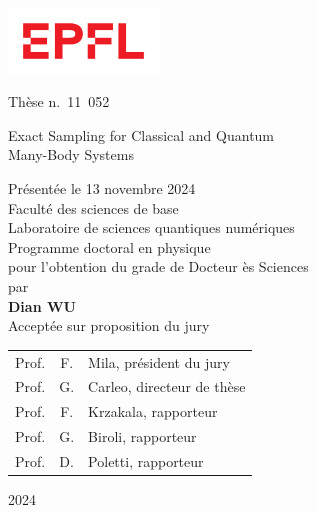 
\begin{titlepage}
\begin{otherlanguage}{french}

\sffamily

\begin{flushleft}
\parbox{0.3\textwidth}{\includegraphics[width=4cm]{images/epfl}}
\end{flushleft}

\begin{flushright}
Thèse n.~11~052
\end{flushright}

\null\vspace{2cm}

\begin{minipage}{4cm}
\end{minipage}
\hfill
\begin{minipage}{11cm}
{\Large Exact Sampling for Classical and Quantum \\[8pt] Many-Body Systems} \\

\vspace{2cm}

\small
Présentée le 13 novembre 2024 \\[8pt]
Faculté des sciences de base \\
Laboratoire de sciences quantiques numériques \\
Programme doctoral en physique \\

pour l'obtention du grade de Docteur ès Sciences \\[8pt]
par \\ [12pt]
{\Large \textbf{Dian WU}} \\[9pt]

Acceptée sur proposition du jury \\[5pt]
\setlength{\tabcolsep}{1.5pt}
\begin{tabular}{@{}lcl}
Prof. & F. & Mila, président du jury \\
Prof. & G. & Carleo, directeur de thèse \\
Prof. & F. & Krzakala, rapporteur \\
Prof. & G. & Biroli, rapporteur \\
Prof. & D. & Poletti, rapporteur \\
\end{tabular}
\end{minipage}
\vspace{2.33cm}
\begin{flushright}
2024
\end{flushright}

\end{otherlanguage}
\end{titlepage}
